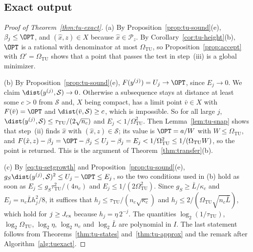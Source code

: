 \subsection{Exact output}\label{app:tu-exact-proof}

\begin{proof}[Proof of Theorem~\ref{thm:tu-exact}]
(a) By Proposition~\ref{prop:tu-sound}(e), $\beta_j\le\OPT$, and
$(\hat x,z)\in X$ because $\hat x\in\mathcal P_z$. By
Corollary~\ref{cor:tu-height}(b), $\OPT$ is a rational with denominator at most
$\Omega_{\mathrm{TU}}$, so Proposition~\ref{prop:accept} with
$\Omega'=\Omega_{\mathrm{TU}}$ shows that a point that passes the test in
step~(iii) is a global minimizer.

(b) By Proposition~\ref{prop:tu-sound}(e), $F(y^{(j)})=U_j\to\OPT$, since
$E_j\to0$. We claim $\dist(y^{(j)},\mathcal S)\to0$. Otherwise a subsequence
stays at distance at least some $c>0$ from $\mathcal S$ and, $X$ being compact,
has a limit point $\bar v\in X$ with $F(\bar v)=\OPT$ and
$\dist(\bar v,\mathcal S)\ge c$, which is impossible. So for all large $j$,
$\dist(y^{(j)},\mathcal S)\le\tau_{\mathrm{TU}}/(2\sqrt{n_c})$ and
$E_j<1/\Omega_{\mathrm{TU}}^2$. Then Lemma~\ref{lem:tu-snap} shows that
step~(ii) finds $\hat x$ with $(\hat x,z)\in\mathcal S$; its value is
$\OPT=a/W$ with $W\le\Omega_{\mathrm{TU}}$, and
$F(\hat x,z)-\beta_j=\OPT-\beta_j\le U_j-\beta_j=E_j<1/\Omega_{\mathrm{TU}}^2
\le1/(\Omega_{\mathrm{TU}}W)$, so the point is returned. This is the argument
of Theorem~\ref{thm:transfer}(b).

(c) By \eqref{eq:tu-setgrowth} and Proposition~\ref{prop:tu-sound}(e),
$g_S\dist(y^{(j)},\mathcal S)^2\le U_j-\OPT\le E_j$, so the two conditions used
in (b) hold as soon as $E_j\le g_S\tau_{\mathrm{TU}}^2/(4n_c)$ and
$E_j\le1/(2\Omega_{\mathrm{TU}}^2)$. Since $g_S\ge\bar L/\kappa_c$ and
$E_j=n_c\bar Lh_j^2/8$, it suffices that
$h_j\le\tau_{\mathrm{TU}}/(n_c\sqrt{\kappa_c})$ and
$h_j\le2/(\Omega_{\mathrm{TU}}\sqrt{n_c\bar L})$, which hold for
$j\ge J_{\rm ex}$ because $h_j=\eta\,2^{-j}$. The quantities
$\log_2(1/\tau_{\mathrm{TU}})$, $\log_2\Omega_{\mathrm{TU}}$, $\log_2\eta$,
$\log_2n_c$ and $\log_2\bar L$ are polynomial in $I$. The last statement
follows from Theorems~\ref{thm:tu-states} and~\ref{thm:tu-approx} and the
remark after Algorithm~\ref{alg:tuexact}.
\end{proof}

